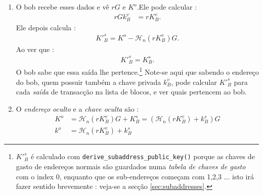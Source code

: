 \begin{enumerate}
	\item O bob recebe esses dados e vê $r G$ e $K^o$.\newline Ele pode calcular : 
	\begin{align*}
	r G k_B^v &= r K_B^v.
	\end{align*}
\newline Ele depois calcula :
	\begin{align*}
	K'^s_B = K^o - \mathcal{H}_n(r K_B^v)G.
	\end{align*}
Ao ver que : 
	\begin{align*}
	K'^s_B = K_B^s.
	\end{align*}
O bob sabe que essa saída lhe pertence.\footnote{$K'^s_B $ é calculado com {\tt derive\_subaddress\_public\_key()} porque as chaves de gasto de endereços normais são guardados numa {\em tabela de chaves de gasto} com o index 0, enquanto que os sub-endereços começam com 1,2,3 ... isto irá fazer sentido brevemente : veja-se a secção \ref{sec:subaddresses}.} 
\newline Note-se aqui que sabendo o endereço do bob, quem possuir também a chave privada $k_B^v$, pode calcular $K'^s_B$ para cada {\em saída} de transacção na lista de blocos, e ver quais pertencem ao bob.

	\item O {\em endereço oculto} e a {\em chave oculta} são :\vspace{.175cm}
	\begin{align*}
		K^o &= \mathcal{H}_n(r K_B^v)G + K_B^s = (\mathcal{H}_n(r K_B^v) + k_B^s)G  \\ 
		k^o &= \mathcal{H}_n(r K_B^v) + k_B^s
	\end{align*}
\end{enumerate}

